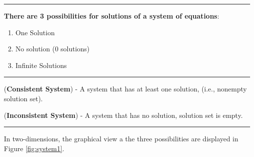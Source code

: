 \rule[0.01in]{\textwidth}{0.0025in}

 





\textbf{There are 3 possibilities for solutions of a system of equations}:
\begin{enumerate}
	\item One Solution
	\item No solution (0 solutions)
	\item Infinite Solutions
\end{enumerate}


\rule[0.01in]{\textwidth}{0.0025in}

\begin{definition} (\textbf{Consistent System}) -  A system that has at least one solution, (i.e., nonempty solution set).  \end{definition}






 
\begin{definition} (\textbf{Inconsistent System}) -  A system that has no solution, solution set is empty.  \end{definition}



\rule[0.01in]{\textwidth}{0.0025in}





In two-dimensions, the graphical view a the three possibilities are displayed in Figure \ref{fig:system1}. 


